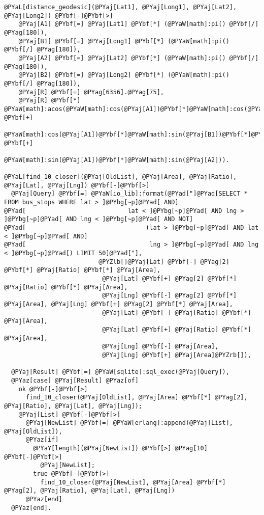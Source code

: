 \begin{Verbatim}[commandchars=@\[\]]
@PYaL[distance_geodesic](@PYaj[Lat1], @PYaj[Long1], @PYaj[Lat2], @PYaj[Long2]) @PYbf[-]@PYbf[>]
    @PYaj[A1] @PYbf[=] @PYaj[Lat1] @PYbf[*] (@PYaW[math]:pi() @PYbf[/] @PYag[180]),
    @PYaj[B1] @PYbf[=] @PYaj[Long1] @PYbf[*] (@PYaW[math]:pi() @PYbf[/] @PYag[180]),
    @PYaj[A2] @PYbf[=] @PYaj[Lat2] @PYbf[*] (@PYaW[math]:pi() @PYbf[/] @PYag[180]),
    @PYaj[B2] @PYbf[=] @PYaj[Long2] @PYbf[*] (@PYaW[math]:pi() @PYbf[/] @PYag[180]),
    @PYaj[R] @PYbf[=] @PYag[6356].@PYag[75],
    @PYaj[R] @PYbf[*] @PYaW[math]:acos(@PYaW[math]:cos(@PYaj[A1])@PYbf[*]@PYaW[math]:cos(@PYaj[B1])@PYbf[*]@PYaW[math]:cos(@PYaj[A2])@PYbf[*]@PYaW[math]:cos(@PYaj[B2]) @PYbf[+] 
                  @PYaW[math]:cos(@PYaj[A1])@PYbf[*]@PYaW[math]:sin(@PYaj[B1])@PYbf[*]@PYaW[math]:cos(@PYaj[A2])@PYbf[*]@PYaW[math]:sin(@PYaj[B2]) @PYbf[+]
                  @PYaW[math]:sin(@PYaj[A1])@PYbf[*]@PYaW[math]:sin(@PYaj[A2])).

@PYaL[find_10_closer](@PYaj[OldList], @PYaj[Area], @PYaj[Ratio], @PYaj[Lat], @PYaj[Lng]) @PYbf[-]@PYbf[>]
  @PYaj[Query] @PYbf[=] @PYaW[io_lib]:format(@PYad["]@PYad[SELECT * FROM bus_stops WHERE lat > ]@PYbg[~p]@PYad[ AND]
@PYad[                            lat < ]@PYbg[~p]@PYad[ AND lng > ]@PYbg[~p]@PYad[ AND lng < ]@PYbg[~p]@PYad[ AND NOT]
@PYad[                                 (lat > ]@PYbg[~p]@PYad[ AND lat < ]@PYbg[~p]@PYad[ AND]
@PYad[                                  lng > ]@PYbg[~p]@PYad[ AND lng < ]@PYbg[~p]@PYad[) LIMIT 50]@PYad["],
                          @PYZlb[]@PYaj[Lat] @PYbf[-] @PYag[2] @PYbf[*] @PYaj[Ratio] @PYbf[*] @PYaj[Area],
                           @PYaj[Lat] @PYbf[+] @PYag[2] @PYbf[*] @PYaj[Ratio] @PYbf[*] @PYaj[Area],
                           @PYaj[Lng] @PYbf[-] @PYag[2] @PYbf[*] @PYaj[Area], @PYaj[Lng] @PYbf[+] @PYag[2] @PYbf[*] @PYaj[Area],
                           @PYaj[Lat] @PYbf[-] @PYaj[Ratio] @PYbf[*] @PYaj[Area],
                           @PYaj[Lat] @PYbf[+] @PYaj[Ratio] @PYbf[*] @PYaj[Area],
                           @PYaj[Lng] @PYbf[-] @PYaj[Area],
                           @PYaj[Lng] @PYbf[+] @PYaj[Area]@PYZrb[]),

  @PYaj[Result] @PYbf[=] @PYaW[sqlite]:sql_exec(@PYaj[Query]),
  @PYaz[case] @PYaj[Result] @PYaz[of]
    ok @PYbf[-]@PYbf[>]
      find_10_closer(@PYaj[OldList], @PYaj[Area] @PYbf[*] @PYag[2], @PYaj[Ratio], @PYaj[Lat], @PYaj[Lng]);
    @PYaj[List] @PYbf[-]@PYbf[>]
      @PYaj[NewList] @PYbf[=] @PYaW[erlang]:append(@PYaj[List], @PYaj[OldList]),
      @PYaz[if]
        @PYaY[length](@PYaj[NewList]) @PYbf[>] @PYag[10] @PYbf[-]@PYbf[>]
          @PYaj[NewList];
        true @PYbf[-]@PYbf[>]
          find_10_closer(@PYaj[NewList], @PYaj[Area] @PYbf[*] @PYag[2], @PYaj[Ratio], @PYaj[Lat], @PYaj[Lng])
      @PYaz[end]  
  @PYaz[end].
\end{Verbatim}
